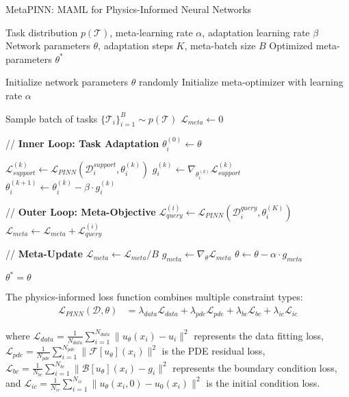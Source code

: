 \documentclass[review]{elsarticle}
\begin{document}
\begin{algorithm}[H]
\caption{MetaPINN: MAML for Physics-Informed Neural Networks}
\begin{algorithmic}[1]
\REQUIRE Task distribution $p(\mathcal{T})$, meta-learning rate $\alpha$, adaptation learning rate $\beta$
\REQUIRE Network parameters $\theta$, adaptation steps $K$, meta-batch size $B$
\ENSURE Optimized meta-parameters $\theta^*$

\STATE Initialize network parameters $\theta$ randomly
\STATE Initialize meta-optimizer with learning rate $\alpha$

    \STATE Sample batch of tasks $\{\mathcal{T}_i\}_{i=1}^B \sim p(\mathcal{T})$
    \STATE $\mathcal{L}_{meta} \leftarrow 0$
    
        \STATE // \textbf{Inner Loop: Task Adaptation}
        \STATE $\theta_i^{(0)} \leftarrow \theta$
        
            \STATE $\mathcal{L}_{support}^{(k)} \leftarrow \mathcal{L}_{PINN}(\mathcal{D}_i^{support}, \theta_i^{(k)})$
            \STATE $g_i^{(k)} \leftarrow \nabla_{\theta_i^{(k)}} \mathcal{L}_{support}^{(k)}$
            \STATE $\theta_i^{(k+1)} \leftarrow \theta_i^{(k)} - \beta \cdot g_i^{(k)}$
        \ENDFOR
        
        \STATE // \textbf{Outer Loop: Meta-Objective}
        \STATE $\mathcal{L}_{query}^{(i)} \leftarrow \mathcal{L}_{PINN}(\mathcal{D}_i^{query}, \theta_i^{(K)})$
        \STATE $\mathcal{L}_{meta} \leftarrow \mathcal{L}_{meta} + \mathcal{L}_{query}^{(i)}$
    \ENDFOR
    
    \STATE // \textbf{Meta-Update}
    \STATE $\mathcal{L}_{meta} \leftarrow \mathcal{L}_{meta} / B$
    \STATE $g_{meta} \leftarrow \nabla_\theta \mathcal{L}_{meta}$
    \STATE $\theta \leftarrow \theta - \alpha \cdot g_{meta}$
\ENDWHILE

\RETURN $\theta^* = \theta$
\end{algorithmic}
\end{algorithm}

The physics-informed loss function combines multiple constraint types:
\begin{align}
\mathcal{L}_{PINN}(\mathcal{D}, \theta) &= \lambda_{data} \mathcal{L}_{data} + \lambda_{pde} \mathcal{L}_{pde} + \lambda_{bc} \mathcal{L}_{bc} + \lambda_{ic} \mathcal{L}_{ic}
\end{align}

where $\mathcal{L}_{data} = \frac{1}{N_{data}} \sum_{i=1}^{N_{data}} \|u_\theta(x_i) - u_i\|^2$ represents the data fitting loss, $\mathcal{L}_{pde} = \frac{1}{N_{pde}} \sum_{i=1}^{N_{pde}} \|\mathcal{F}[u_\theta](x_i)\|^2$ is the PDE residual loss, $\mathcal{L}_{bc} = \frac{1}{N_{bc}} \sum_{i=1}^{N_{bc}} \|\mathcal{B}[u_\theta](x_i) - g_i\|^2$ represents the boundary condition loss, and $\mathcal{L}_{ic} = \frac{1}{N_{ic}} \sum_{i=1}^{N_{ic}} \|u_\theta(x_i, 0) - u_0(x_i)\|^2$ is the initial condition loss.
\end{document}
